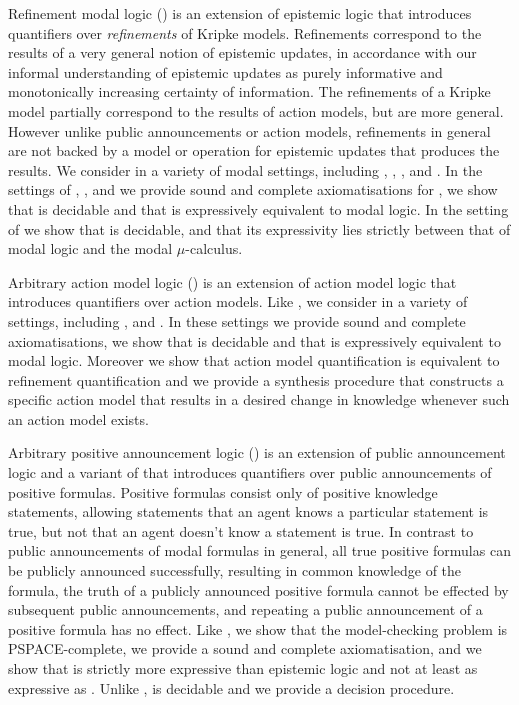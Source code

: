 Refinement modal logic (\logicRml{}) is an extension of epistemic logic that introduces quantifiers over {\em refinements} of Kripke models.
Refinements correspond to the results of a very general notion of epistemic updates, in accordance with our informal understanding of epistemic updates as purely informative and monotonically increasing certainty of information.
The refinements of a Kripke model partially correspond to the results of action models, but are more general.
However unlike public announcements or action models, refinements in general are not backed by a model or operation for epistemic updates that produces the results.
We consider \logicRml{} in a variety of modal settings, including \classK{}, \classKF{}, \classKFF{}, \classKD{} and \classS{}.
In the settings of \classK{}, \classKFF{}, \classKD{} and \classS{} we provide sound and complete axiomatisations for \logicRml{}, we show that \logicRml{} is decidable and that \logicRml{} is expressively equivalent to modal logic.
In the setting of \classKF{} we show that \logicRml{} is decidable, and that its expressivity lies strictly between that of modal logic and the modal $\mu$-calculus.

Arbitrary action model logic (\logicAaml{}) is an extension of action model logic that introduces quantifiers over action models.
Like \logicRml{}, we consider \logicAaml{} in a variety of settings, including \classK{}, \classKFF{} and \classS{}.
In these settings we provide sound and complete axiomatisations, we show that \logicAaml{} is decidable and that \logicAaml{} is expressively equivalent to modal logic.
Moreover we show that action model quantification is equivalent to refinement quantification and we provide a synthesis procedure that constructs a specific action model that results in a desired change in knowledge whenever such an action model exists.

Arbitrary positive announcement logic (\logicPapal{}) is an extension of public announcement logic and a variant of \logicApal{} that introduces quantifiers over public announcements of positive formulas.
Positive formulas consist only of positive knowledge statements, allowing statements that an agent knows a particular statement is true, but not that an agent doesn't know a statement is true.
In contrast to public announcements of modal formulas in general, all true positive formulas can be publicly announced successfully, resulting in common knowledge of the formula, the truth of a publicly announced positive formula cannot be effected by subsequent public announcements, and repeating a public announcement of a positive formula has no effect.
Like \logicApal{}, we show that the model-checking problem is PSPACE-complete, we provide a sound and complete axiomatisation, and we show that \logicPapal{} is strictly more expressive than epistemic logic and not at least as expressive as \logicApal{}.
Unlike \logicApal{}, \logicPapal{} is decidable and we provide a decision procedure.


